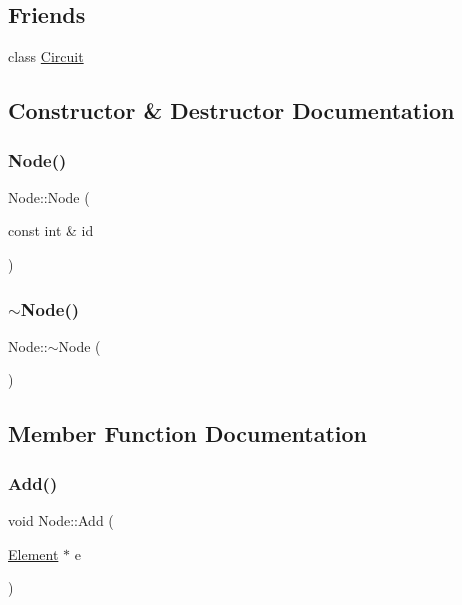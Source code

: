 \subsection*{Friends}
\begin{DoxyCompactItemize}
\item 
class \hyperlink{class_node_a120b136c2c9bc1938e0cd2cca80d91e4}{Circuit}
\end{DoxyCompactItemize}


\subsection{Constructor \& Destructor Documentation}
\mbox{\label{class_node_ad31a6c58b167b4a444962ead34cd93a1}} 
\subsubsection{\texorpdfstring{Node()}{Node()}}
{\footnotesize\ttfamily Node\+::\+Node (\begin{DoxyParamCaption}\item[{const int \&}]{id }\end{DoxyParamCaption})}

\mbox{\label{class_node_aa0840c3cb5c7159be6d992adecd2097c}} 
\subsubsection{\texorpdfstring{$\sim$\+Node()}{~Node()}}
{\footnotesize\ttfamily Node\+::$\sim$\+Node (\begin{DoxyParamCaption}{ }\end{DoxyParamCaption})}



\subsection{Member Function Documentation}
\mbox{\label{class_node_a4aff13ab274ffa9fa69be340c28ee9d6}} 
\subsubsection{\texorpdfstring{Add()}{Add()}}
{\footnotesize\ttfamily void Node\+::\+Add (\begin{DoxyParamCaption}\item[{\hyperlink{class_element}{Element} $\ast$}]{e }\end{DoxyParamCaption})}


